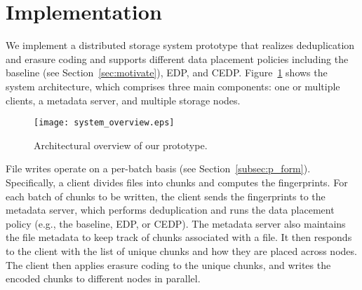 \section{Implementation}
\label{sec:impl}


We implement a distributed storage system prototype that realizes
deduplication and erasure coding and supports different data placement
policies including the baseline (see Section~\ref{sec:motivate}), EDP, and
CEDP.  Figure~\ref{fig:prototype} shows the system architecture, which 
comprises three main components: one or multiple clients, a metadata server,
and multiple storage nodes.  

\begin{figure}[H]
\centering
\texttt{[image: system\_overview.eps]}
\vspace{-15pt}
\caption{Architectural overview of our prototype.}
\label{fig:prototype}
\vspace{-6pt}
\end{figure}

File writes operate on a per-batch basis (see Section~\ref{subsec:p_form}).
Specifically, a client divides files into chunks and computes the
fingerprints.  For each batch of chunks to be written, the client sends the
fingerprints to the metadata server, which performs deduplication and runs the
data placement policy (e.g., the baseline, EDP, or CEDP).  The metadata server
also maintains the file metadata to keep track of chunks associated with a
file.  It then responds to the client with the list of unique chunks and how
they are placed across nodes.  The client then applies erasure coding to the
unique chunks, and writes the encoded chunks to different nodes in parallel. 



